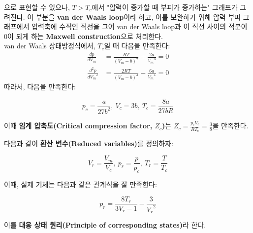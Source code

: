             으로 표현할 수 있으나, $T > T_c$에서 "압력이 증가할 때 부피가 증가하는" 그래프가 그려진다. 이 부분을 \textbf{van der Waals loop}이라 
            하고, 이를 보완하기 위해 압력-부피 그래프에서 압력축에 수직인 직선을 그어 van der Waals loop과 이 직선 사이의 적분이 $0$이 되게 
            하는 \textbf{Maxwell construction}으로 처리한다. \\
            van der Waals 상태방정식에서, $T_c$일 때 다음을 만족한다:
                \begin{align*}
                    \frac{dp}{dV_m} &= \frac{RT}{\left( V_m - b \right)^2} + \frac{2a}{{V_m}^3} = 0 \\
                    \frac{d^2 p}{d{V_m}^2} &= \frac{2RT}{\left( V_m - b \right)^3} - \frac{6a}{{V_m}^4} = 0
                \end{align*}
            따라서, 다음을 만족한다:
            \begin{law}[임계 압력, 임계 부피, 임계 온도]
                \begin{equation*}
                    p_c = \frac{a}{27b^2},\ V_c = 3b, \ T_c = \frac{8a}{27bR}
                \end{equation*}
            \end{law}
            이때 \textbf{임계 압축도(Critical compression factor, $Z_c$)}는 $Z_c = \frac{p_c V_c}{RT_c} = \frac{3}{8}$을 
            만족한다.
            \par 다음과 같이 \textbf{환산 변수(Reduced variables)}를 정의하자:
            \begin{defn}[환산 변수]
                \begin{equation*}
                    V_r = \frac{V_m}{V_c}, \ p_r = \frac{p}{p_c}, \ T_r = \frac{T}{T_c}
                \end{equation*}
            \end{defn}
            이때, 실제 기체는 다음과 같은 관계식을 잘 만족한다:
            \begin{law}[대응 상태 원리]
                \begin{equation*}
                    p_r = \frac{8T_r}{3V_r - 1} - \frac{3}{{V_r}^2}
                \end{equation*}
            \end{law}
            이를 \textbf{대응 상태 원리(Principle of corresponding states)}라 한다.